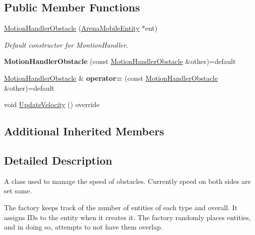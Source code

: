 \subsection*{Public Member Functions}
\begin{DoxyCompactItemize}
\item 
\hyperlink{classMotionHandlerObstacle_a372bbd2b587c47fd3535d7044a8e8938}{Motion\+Handler\+Obstacle} (\hyperlink{classArenaMobileEntity}{Arena\+Mobile\+Entity} $\ast$ent)\hypertarget{classMotionHandlerObstacle_a372bbd2b587c47fd3535d7044a8e8938}{}\label{classMotionHandlerObstacle_a372bbd2b587c47fd3535d7044a8e8938}

\begin{DoxyCompactList}\small\item\em Default constructor for Montion\+Handler. \end{DoxyCompactList}\item 
{\bfseries Motion\+Handler\+Obstacle} (const \hyperlink{classMotionHandlerObstacle}{Motion\+Handler\+Obstacle} \&other)=default\hypertarget{classMotionHandlerObstacle_a4454a8e05721c4b0aabc263961ae5f8a}{}\label{classMotionHandlerObstacle_a4454a8e05721c4b0aabc263961ae5f8a}

\item 
\hyperlink{classMotionHandlerObstacle}{Motion\+Handler\+Obstacle} \& {\bfseries operator=} (const \hyperlink{classMotionHandlerObstacle}{Motion\+Handler\+Obstacle} \&other)=default\hypertarget{classMotionHandlerObstacle_a6678c9e294e30b6f932fa49919fe27ff}{}\label{classMotionHandlerObstacle_a6678c9e294e30b6f932fa49919fe27ff}

\item 
void \hyperlink{classMotionHandlerObstacle_ad41e6be12c163937f5ccab36c4e35be8}{Update\+Velocity} () override
\end{DoxyCompactItemize}
\subsection*{Additional Inherited Members}


\subsection{Detailed Description}
A class used to manage the speed of obstacles. Currently speed on both sides are set same. 

The factory keeps track of the number of entities of each type and overall. It assigns ID\textquotesingle{}s to the entity when it creates it. The factory randomly places entities, and in doing so, attempts to not have them overlap. 

